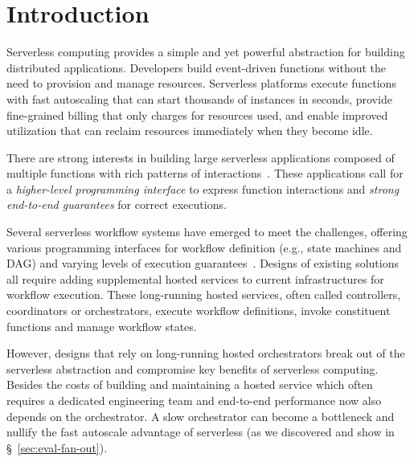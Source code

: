 \section{Introduction}

Serverless computing provides a simple and yet powerful abstraction for
building distributed applications.  Developers build event-driven functions
without the need to provision and manage resources. Serverless platforms
execute functions with fast autoscaling that can start thousands of instances
in seconds, provide fine-grained billing that only charges for resources used, and
enable improved utilization that can reclaim resources immediately when they become
idle.

There are strong interests in building large serverless applications composed
of multiple functions with rich patterns of interactions~\cite{excamera,
pywren, gg-atc, beldi, boki}.  These applications call for a \emph{higher-level
programming interface} to express function interactions and \emph{strong
end-to-end guarantees} for correct executions.

Several serverless workflow systems have emerged to meet the challenges,
offering various programming interfaces for workflow definition  (e.g., state
machines and DAG) and varying levels of execution guarantees~\cite{excamera,
gg-atc, aws-step-functions, google-cloud-composer, google-workflows,
durable-functions, kappa}. Designs of existing solutions all require adding
supplemental hosted services to current infrastructures for workflow
execution. These long-running hosted services, often called controllers,
coordinators or orchestrators, execute workflow definitions, invoke
constituent functions and manage workflow states.


However, designs that rely on long-running hosted orchestrators break out of
the serverless abstraction and compromise key benefits of serverless
computing. Besides the costs of building and maintaining a hosted service
which often requires a dedicated engineering team and end-to-end performance now
also depends on the orchestrator. A slow orchestrator can become a
bottleneck and nullify the fast autoscale advantage of serverless (as we
discovered and show in \S~\ref{sec:eval-fan-out}).

